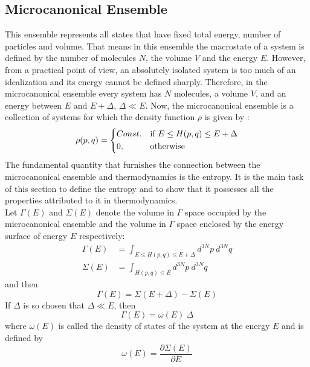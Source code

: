 \subsection{Microcanonical Ensemble} 
This ensemble represents all states that have fixed total energy, number of particles and volume. That means in this ensemble the macrostate of a system is defined by the number of molecules $N$, the volume $V$ and the energy $E$. However, from a practical point of view, an absolutely isolated system is too much of an idealization and its energy cannot be defined sharply.  Therefore, in the microcanonical ensemble every system has $N$ molecules, a volume $V$, and an energy between $E$ and $E + \Delta$, $\Delta \ll  E $. Now, the microcanonical ensemble is a collection of systems for which the density function $\rho $  is given by \citep{huang2009, pathria1996}:
\begin{eqnarray}
\rho (p,q)= \begin{dcases}
    Const. & \text{if }  E \leq H(p,q)\leq  E+ \Delta \\
    0,              & \text{otherwise}
\end{dcases} 
\end{eqnarray}
The fundamental quantity that furnishes the connection between the microcanonical ensemble and thermodynamics is the entropy. It is the main task of this section to define the entropy and to show that it possesses all the properties attributed to it in thermodynamics.\\
Let $\Gamma(E) $  and  $\Sigma (E)$  denote the volume in $\Gamma $ space occupied by the microcanonical ensemble and  the volume in $\Gamma $ space enclosed by the energy surface of energy $E$ respectively: 
\begin{align}
\Gamma(E) &= \int_{E \leq H(p, q)\leq  E+ \Delta} d^{3N}p~ d^{3N}q  \\
\Sigma (E) & = \int_{ H(p, q)\leq  E } d^{3N}p~ d^{3N}q 
\end{align} and then 
\begin{equation}
\Gamma(E) = \Sigma (E + \Delta ) - \Sigma (E) 
\end{equation}
If $\Delta $ is so chosen that $\Delta \ll E $, then
\begin{equation}
\Gamma(E) = \omega (E) ~ \Delta
\end{equation}
where $\omega(E)$ is called the density of states of the system at the energy $E$ and is
defined by 
\begin{equation}
\omega(E)= \frac{\partial \Sigma (E)}{\partial E}
\end{equation}

